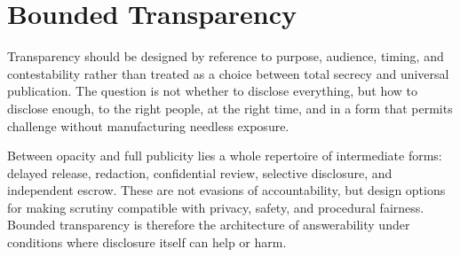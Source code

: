 
\chapter{Bounded Transparency}
\label{ch:ch099}

Transparency should be designed by reference to purpose, audience, timing, and contestability rather than treated as a choice between total secrecy and universal publication. The question is not whether to disclose everything, but how to disclose enough, to the right people, at the right time, and in a form that permits challenge without manufacturing needless exposure.

Between opacity and full publicity lies a whole repertoire of intermediate forms: delayed release, redaction, confidential review, selective disclosure, and independent escrow. These are not evasions of accountability, but design options for making scrutiny compatible with privacy, safety, and procedural fairness. Bounded transparency is therefore the architecture of answerability under conditions where disclosure itself can help or harm.
